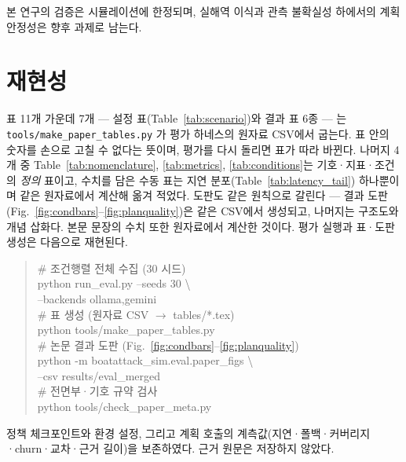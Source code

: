 본 연구의 검증은 시뮬레이션에 한정되며, 실해역 이식과 관측 불확실성 하에서의 계획 안정성은
향후 과제로 남는다.

\section*{재현성}

표 11개 가운데 7개 --- 설정 표(Table~\ref{tab:scenario})와 결과 표 6종 --- 는
\texttt{tools/make\_paper\_tables.py} 가 평가 하네스의 원자료 CSV에서 굽는다. 표 안의 숫자를
손으로 고칠 수 없다는 뜻이며, 평가를 다시 돌리면 표가 따라 바뀐다. 나머지 4개 중
Table~\ref{tab:nomenclature}, \ref{tab:metrics}, \ref{tab:conditions}는 기호·지표·조건의
\emph{정의} 표이고, 수치를 담은 수동 표는 지연 분포(Table~\ref{tab:latency_tail}) 하나뿐이며
같은 원자료에서 계산해 옮겨 적었다. 도판도 같은 원칙으로 갈린다 --- 결과 도판
(Fig.~\ref{fig:condbars}--\ref{fig:planquality})은 같은 CSV에서 생성되고, 나머지는 구조도와
개념 삽화다. 본문 문장의 수치 또한 원자료에서 계산한 것이다. 평가 실행과 표·도판 생성은
다음으로 재현된다.

\begin{quote}\ttfamily\footnotesize\raggedright
{} 
\# 조건행렬 전체 수집 (30 시드)\\
python run\_eval.py --seeds 30 \textbackslash\\
\hspace*{1.4em}--backends ollama,gemini\\[3pt]
\# 표 생성 (원자료 CSV $\to$ tables/*.tex)\\
python tools/make\_paper\_tables.py\\[3pt]
\# 논문 결과 도판 (Fig.~\ref{fig:condbars}--\ref{fig:planquality})\\
python -m boatattack\_sim.eval.paper\_figs \textbackslash\\
\hspace*{1.4em}--csv results/eval\_merged\\[3pt]
\# 전면부·기호 규약 검사\\
python tools/check\_paper\_meta.py
\end{quote}

\noindent
정책 체크포인트와 환경 설정, 그리고 계획 호출의 계측값(지연·폴백·커버리지·churn·교차·근거 길이)을 보존하였다. 근거 원문은 저장하지 않았다.
